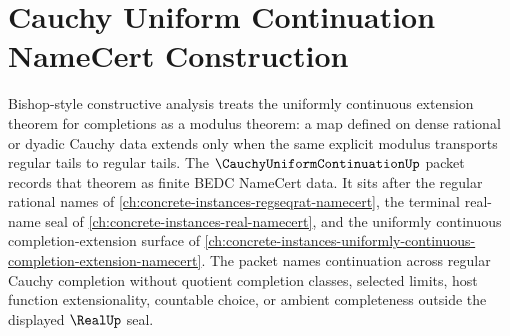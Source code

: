 \chapter{Cauchy Uniform Continuation NameCert Construction}
\label{ch:concrete-instances-cauchy-uniform-continuation-namecert}

Bishop-style constructive analysis treats the uniformly continuous extension theorem for completions as a modulus theorem: a map defined on dense rational or dyadic Cauchy data extends only when the same explicit modulus transports regular tails to regular tails. The $\CauchyUniformContinuationUp$ packet records that theorem as finite BEDC NameCert data. It sits after the regular rational names of \autoref{ch:concrete-instances-regseqrat-namecert}, the terminal real-name seal of \autoref{ch:concrete-instances-real-namecert}, and the uniformly continuous completion-extension surface of \autoref{ch:concrete-instances-uniformly-continuous-completion-extension-namecert}. The packet names continuation across regular Cauchy completion without quotient completion classes, selected limits, host function extensionality, countable choice, or ambient completeness outside the displayed $\RealUp$ seal.


